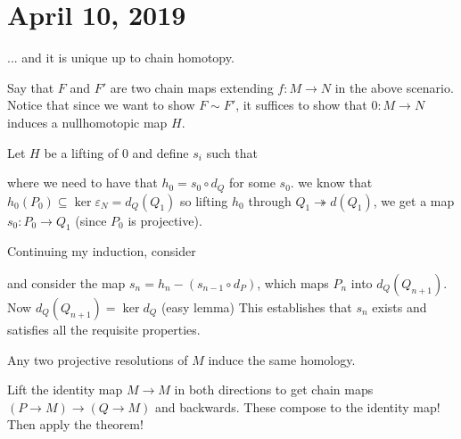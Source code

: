 \documentclass[12pt]{article}
\begin{document}
\section{April 10, 2019}
\begin{thm}
	... and it is unique up to chain homotopy.
\end{thm}
\begin{prf}
	Say that $F$ and $F'$ are two chain maps extending $f:M\to N$ in the above scenario.
	Notice that since we want to show $F\sim F'$, it suffices to show that $0:M\to N$ induces 
	a nullhomotopic map $H$.

	Let $H$ be a lifting of $0$ and define $s_i$ such that
	\begin{center}
	\end{center}
	where we need to have that $h_0=s_0\circ d_Q$ for some $s_0$. we know that $h_0(P_0)\subseteq\ker\varepsilon_N=d_Q(Q_1)$
	so lifting $h_0$ through $Q_1\twoheadrightarrow d(Q_1)$, we get a map $s_0:P_0\to Q_1$ (since $P_0$ is projective).

	Continuing my induction, consider
	\begin{center}
	\end{center}
	and consider the map $s_n=h_n-(s_{n-1}\circ d_P)$, which maps $P_n$ into $d_Q(Q_{n+1})$. Now $d_Q(Q_{n+1})=\ker d_Q$ (easy lemma)
	This establishes that $s_n$ exists and satisfies all the requisite properties.
\end{prf}
\begin{cor}
	Any two projective resolutions of $M$ induce the same homology.
\end{cor}
\begin{rmk}
	Lift the identity map $M\to M$ in both directions to get chain maps $(P\to M)\to(Q\to M)$
	and backwards. These compose to the identity map! Then apply the theorem!
\end{rmk}
\end{document}
